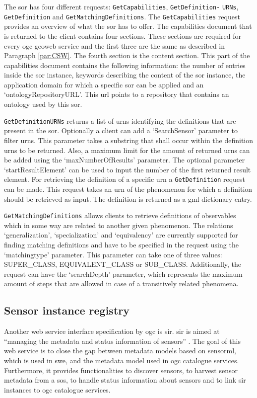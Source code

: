 The \ac{sor} has four different requests: \texttt{GetCapabilities}, \texttt{GetDefinition-} \texttt{URNs}, \texttt{GetDefinition} and \texttt{GetMatchingDefinitions}. The \texttt{GetCapabilities} request provides an overview of what the \ac{sor} has to offer. The capabilities document that is returned to the client contains four sections. These sections are required for every \ac{ogc} geoweb service and the first three are the same as described in Paragraph \ref{par:CSW}. The fourth section is the content section. This part of the capabilities document contains the following information: the number of entries inside the \ac{sor} instance, keywords describing the content of the \ac{sor} instance, the application domain for which a specific \ac{sor} can be applied and an `ontologyRepositoryURL'. This \ac{url} points to a repository that contains an ontology used by this \ac{sor}.

\texttt{GetDefinitionURNs} returns a list of \acp{urn} identifying the definitions that are present in the \ac{sor}. Optionally a client can add a `SearchSensor' parameter to filter \acp{urn}. This parameter takes a substring that shall occur within the definition \acp{urn} to be returned. Also, a maximum limit for the amount of returned \acp{urn} can be added using the `maxNumberOfResults' parameter. The optional parameter `startResultElement' can be used to input the number of the first returned result element. For retrieving the definition of a specific \ac{urn} a \texttt{GetDefinition} request can be made. This request takes an \ac{urn} of the phenomenon for which a definition should be retrieved as input. The definition is returned as a \ac{gml} dictionary entry. 

\texttt{GetMatchingDefinitions} allows clients to retrieve definitions of observables which in some way are related to another given phenomenon. The relations `generalization', `specialization' and `equivalency' are currently supported for finding matching definitions \citep{SW:OGC4} and have to be specified in the request using the `matchingtype' parameter. This parameter can take one of three values: SUPER\_CLASS, EQUIVALENT\_CLASS or SUB\_CLASS. Additionally, the request can have the `searchDepth' parameter, which represents the maximum amount of steps that are allowed in case of a transitively related phenomena.  

\subsection{Sensor instance registry}
Another web service interface specification by \ac{ogc} is \ac{sir}. \ac{sir} is aimed at \enquote{managing the metadata and status information of sensors} \cite[p. xii]{SW:OGC3}. The goal of this web service is to close the gap between metadata models based on \ac{sensorml}, which is used in \ac{swe}, and the metadata model used in \ac{ogc} catalogue services. Furthermore, it provides functionalities to discover sensors, to harvest sensor metadata from a \ac{sos}, to handle status information about sensors and to link \ac{sir} instances to \ac{ogc} catalogue services. 

